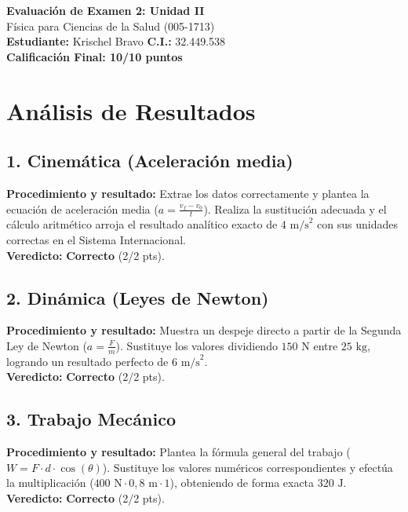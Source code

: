 \documentclass[12pt,letterpaper]{article}
\begin{document}
\begin{center}
    \Large \textbf{Evaluación de Examen 2: Unidad II} \\
    \large Física para Ciencias de la Salud (005-1713) \\
    \vspace{0.5cm}
    \textbf{Estudiante:} Krischel Bravo \quad \textbf{C.I.:} 32.449.538
    \vspace{0.3cm} \\
    \large \textbf{Calificación Final: 10/10 puntos}
\end{center}

\vspace{0.5cm}

\section*{Análisis de Resultados}

\subsection*{1. Cinemática (Aceleración media)}
\textbf{Procedimiento y resultado:} Extrae los datos correctamente y plantea la ecuación de aceleración media ($a = \frac{v_f - v_0}{t}$). Realiza la sustitución adecuada y el cálculo aritmético arroja el resultado analítico exacto de $4 \text{ m/s}^2$ con sus unidades correctas en el Sistema Internacional. \\
\textbf{Veredicto:} \textbf{Correcto} (2/2 pts).

\subsection*{2. Dinámica (Leyes de Newton)}
\textbf{Procedimiento y resultado:} Muestra un despeje directo a partir de la Segunda Ley de Newton ($a = \frac{F}{m}$). Sustituye los valores dividiendo $150 \text{ N}$ entre $25 \text{ kg}$, logrando un resultado perfecto de $6 \text{ m/s}^2$. \\
\textbf{Veredicto:} \textbf{Correcto} (2/2 pts).

\subsection*{3. Trabajo Mecánico}
\textbf{Procedimiento y resultado:} Plantea la fórmula general del trabajo ($W = F \cdot d \cdot \cos(\theta)$). Sustituye los valores numéricos correspondientes y efectúa la multiplicación ($400 \text{ N} \cdot 0,8 \text{ m} \cdot 1$), obteniendo de forma exacta $320 \text{ J}$. \\
\textbf{Veredicto:} \textbf{Correcto} (2/2 pts).
\end{document}
